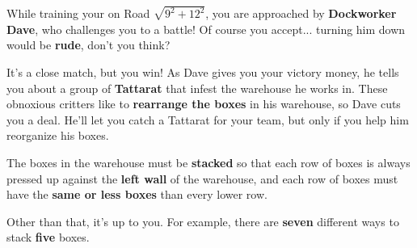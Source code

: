 

\newcommand{\mappBoxRow}[2]{
  \fill[color=lightgray] #1 rectangle #2;
  \draw[step=1]          #1 grid #2;
}


While training your \mappMobimon{} on Road \(\sqrt{9^2+12^2}\), you are
approached
by \textbf{Dockworker Dave}, who challenges you to a \mappMobidot{} battle!
Of course you accept... turning him down would be \textbf{rude},
don't you think?

It's a close match, but you win! As Dave gives you your victory money, he
tells you about a group of \textbf{Tattarat} \mappMobimon{} that infest the
warehouse he works in. These obnoxious critters like to
\textbf{rearrange the boxes} in his warehouse, so Dave cuts you a deal.
He'll let you catch a Tattarat for your team, but only if you help
him reorganize his boxes.

The boxes in the warehouse must be \textbf{stacked} so that
each row of boxes is always pressed up against the \textbf{left wall} of the
warehouse, and each row of boxes must have the \textbf{same or less boxes} than
every lower row.

Other than that, it's up to you. For example, there are \textbf{seven}
different ways to stack \textbf{five} boxes.

